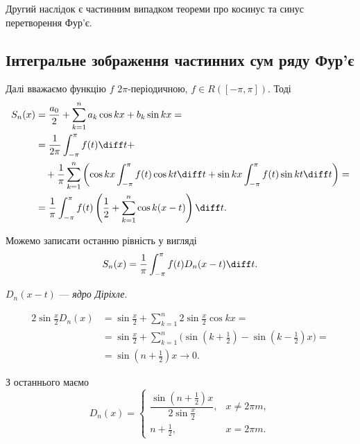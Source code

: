 \begin{remark}
    Другий наслідок є частинним випадком теореми про косинус та синус перетворення Фур'є.
\end{remark}

\subsection{Інтегральне зображення частинних сум ряду Фур'є}

Далі вважаємо функцію $f$ $2\pi$-періодичною, $f \in R([-\pi,\pi])$. Тоді
\begin{equation}
    \begin{aligned}
        S_n(x) 
        &= \frac{a_0}{2} + \sum_{k = 1}^n a_k \cos kx + b_k \sin kx = \\
        &= \frac{1}{2\pi} \int_{-\pi}^\pi f(t) \diff t + \\
        &\quad + \frac{1}{\pi} \sum_{k = 1}^n \left( \cos kx \int_{-\pi}^\pi f(t) \cos kt \diff t + \sin k x \int_{-\pi}^\pi f(t) \sin kt \diff t \right) = \\
        &= \frac{1}{\pi} \int_{-\pi}^\pi f(t) \left( \frac{1}{2} + \sum_{k = 1}^n \cos k (x - t) \right) \diff t.
    \end{aligned}
\end{equation}

Можемо записати останню рівність у вигляді
\begin{equation}
    S_n(x) = \frac{1}{\pi} \int_{-\pi}^\pi f(t) D_n(x - t) \diff t.
\end{equation}

\begin{definition}
    $D_n(x - t)$ --- \textit{ядро Діріхле}.
\end{definition}

\begin{equation}
    \begin{aligned}
        2 \sin \tfrac{x}{2} D_n(x) 
        &= \sin \tfrac{x}{2} + \sum_{k = 1}^n 2 \sin \tfrac{x}{2} \cos k x = \\
        &= \sin \tfrac{x}{2} + \sum_{k = 1}^n \Big( \sin (k + \tfrac{1}{2}) - \sin(k - \tfrac{1}{2}) x \Big) = \\
        &= \sin (n + \tfrac{1}{2}) x \to 0.
    \end{aligned}
\end{equation}

З останнього маємо
\begin{equation}
    D_n(x) = \begin{cases}
        \dfrac{\sin(n + \frac{1}{2})x}{2 \sin \tfrac{x}{2}}, & x \ne 2 \pi m, \\
        n + \frac{1}{2}, & x = 2 \pi m.
    \end{cases}
\end{equation}

